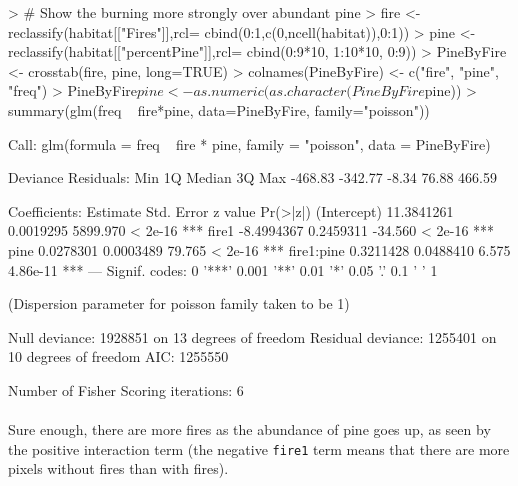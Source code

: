 \documentclass{article}
\begin{document}
\begin{Schunk}
\begin{Sinput}
> # Show the burning more strongly over abundant pine
> fire <- reclassify(habitat[["Fires"]],rcl= cbind(0:1,c(0,ncell(habitat)),0:1))
> pine <- reclassify(habitat[["percentPine"]],rcl= cbind(0:9*10, 1:10*10, 0:9))
> PineByFire <- crosstab(fire, pine, long=TRUE)
> colnames(PineByFire) <- c("fire", "pine", "freq")
> PineByFire$pine <- as.numeric(as.character(PineByFire$pine))
> summary(glm(freq ~ fire*pine, data=PineByFire, family="poisson"))
\end{Sinput}
\begin{Soutput}
Call:
glm(formula = freq ~ fire * pine, family = "poisson", data = PineByFire)

Deviance Residuals: 
    Min       1Q   Median       3Q      Max  
-468.83  -342.77    -8.34    76.88   466.59  

Coefficients:
              Estimate Std. Error  z value Pr(>|z|)    
(Intercept) 11.3841261  0.0019295 5899.970  < 2e-16 ***
fire1       -8.4994367  0.2459311  -34.560  < 2e-16 ***
pine         0.0278301  0.0003489   79.765  < 2e-16 ***
fire1:pine   0.3211428  0.0488410    6.575 4.86e-11 ***
---
Signif. codes:  0 '***' 0.001 '**' 0.01 '*' 0.05 '.' 0.1 ' ' 1

(Dispersion parameter for poisson family taken to be 1)

    Null deviance: 1928851  on 13  degrees of freedom
Residual deviance: 1255401  on 10  degrees of freedom
AIC: 1255550

Number of Fisher Scoring iterations: 6
\end{Soutput}
\end{Schunk}

\paragraph{}
Sure enough, there are more fires as the abundance of pine goes up, as seen by the positive interaction term (the negative \texttt{fire1} term means that there are more pixels without fires than with fires).
\end{document}
